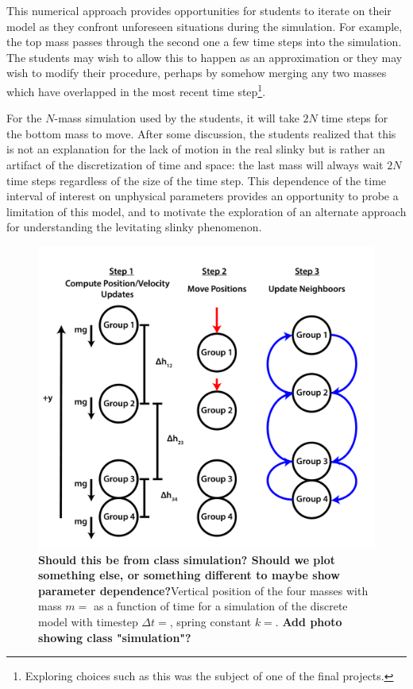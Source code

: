 \documentclass[pre,preprint,superscriptaddress,longbibliography]{revtex4-1}
\newcommand{\FIGdiscrete}{
\begin{figure}[t]\center
\includegraphics[width=\columnwidth]{./img/discrete_model.pdf}
\caption{\label{fig:discrete} \textbf{Should this be from class simulation?  Should we plot something else, or something different to maybe show parameter dependence?}Vertical position of the four masses with mass $m=$ as a function of time for a simulation of the discrete model with timestep $\Delta t=$, spring constant $k=$.  \textbf{Add photo showing class "simulation"?}}
\end{figure}
}
\begin{document}
This numerical approach provides opportunities for students to iterate on their model as they confront unforeseen situations during the simulation. For example, the top mass passes through the second one a few time steps into the simulation.   %
The students may wish to allow this to happen as an approximation
or they may wish to modify their procedure, perhaps by somehow merging any two masses which have overlapped
in the most recent time step\footnote{Exploring choices such as this was the subject of one of the final projects.}.




For the $N$-mass simulation used by the students, it will take $2N$ time steps for the bottom mass to move.  After some discussion, the students realized that this is not an explanation for the lack of motion in the real slinky but is rather an artifact of the discretization of time and space:
the last mass will always wait $2N$ time steps regardless of the size of the time step. 
This dependence of the time interval of interest on unphysical parameters provides an opportunity to probe a limitation of this model, and to motivate the exploration of an alternate approach for understanding the levitating slinky phenomenon.
\FIGdiscrete
\end{document}
